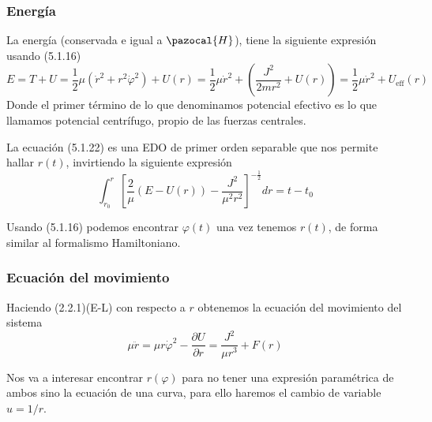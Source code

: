 \subsubsection{Energía}
La energía (conservada e igual a $\pazocal{H}$), tiene la siguiente expresión usando (5.1.16)
\begin{equation} \label{5.1.22}
    E = T+U = \frac{1}{2}\mu\left(\dot{r}^2+r^2\dot{\varphi}^2\right)+U(r)=\frac{1}{2}\mu\dot{r}^2 + \left(\frac{J^2}{2mr^2}+U(r)\right) = \frac{1}{2}\mu\dot{r}^2 + U_{\mbox{eff}}(r)
\end{equation} 
Donde el primer término de lo que denominamos potencial efectivo es lo que llamamos potencial centrífugo, propio de las fuerzas centrales.

La ecuación (5.1.22) es una EDO de primer orden separable que nos permite hallar $r(t)$, invirtiendo la siguiente expresión
\begin{equation} \label{5.1.23}
    \int_{r_0}^r{\left[\frac{2}{\mu}\left(E-U(r)\right)-\frac{J^2}{\mu^2 r^2}\right]^{-\frac{1}{2}}dr}=t-t_0
\end{equation} 

Usando (5.1.16) podemos encontrar $\varphi(t)$ una vez tenemos $r(t)$, de forma similar al formalismo Hamiltoniano.
\subsubsection{Ecuación del movimiento}
Haciendo (2.2.1)(E-L) con respecto a $r$ obtenemos la ecuación del movimiento del sistema
\begin{equation} \label{5.1.24}
    \mu \ddot{r} = \mu r \dot{\varphi}^2 - \frac{\partial U}{\partial r} = \frac{J^2}{\mu r^3}+ F(r)
\end{equation} 

Nos va a interesar encontrar $r(\varphi)$ para no tener una expresión paramétrica de ambos sino la ecuación de una curva, para ello haremos el cambio de variable $u=1/r$.

